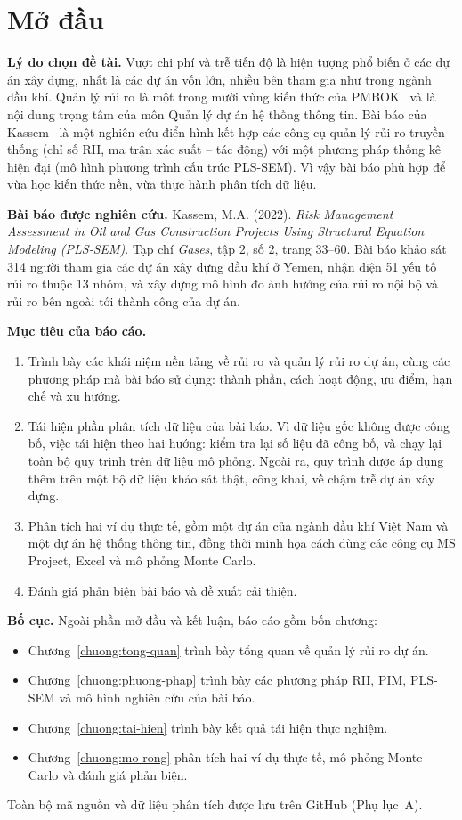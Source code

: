 \chapter*{Mở đầu}

\textbf{Lý do chọn đề tài.} Vượt chi phí và trễ tiến độ là hiện tượng phổ biến ở các dự án xây dựng, nhất là các dự án vốn lớn, nhiều bên tham gia như trong ngành dầu khí. Quản lý rủi ro là một trong mười vùng kiến thức của PMBOK~\cite{pmbok6} và là nội dung trọng tâm của môn Quản lý dự án hệ thống thông tin. Bài báo của Kassem~\cite{kassem2022} là một nghiên cứu điển hình kết hợp các công cụ quản lý rủi ro truyền thống (chỉ số RII, ma trận xác suất -- tác động) với một phương pháp thống kê hiện đại (mô hình phương trình cấu trúc PLS-SEM). Vì vậy bài báo phù hợp để vừa học kiến thức nền, vừa thực hành phân tích dữ liệu.

\textbf{Bài báo được nghiên cứu.} Kassem, M.A. (2022). \emph{Risk Management Assessment in Oil and Gas Construction Projects Using Structural Equation Modeling (PLS-SEM)}. Tạp chí \emph{Gases}, tập 2, số 2, trang 33--60. Bài báo khảo sát 314 người tham gia các dự án xây dựng dầu khí ở Yemen, nhận diện 51 yếu tố rủi ro thuộc 13 nhóm, và xây dựng mô hình đo ảnh hưởng của rủi ro nội bộ và rủi ro bên ngoài tới thành công của dự án.

\textbf{Mục tiêu của báo cáo.}
\begin{enumerate}
  \item Trình bày các khái niệm nền tảng về rủi ro và quản lý rủi ro dự án, cùng các phương pháp mà bài báo sử dụng: thành phần, cách hoạt động, ưu điểm, hạn chế và xu hướng.
  \item Tái hiện phần phân tích dữ liệu của bài báo. Vì dữ liệu gốc không được công bố, việc tái hiện theo hai hướng: kiểm tra lại số liệu đã công bố, và chạy lại toàn bộ quy trình trên dữ liệu mô phỏng. Ngoài ra, quy trình được áp dụng thêm trên một bộ dữ liệu khảo sát thật, công khai, về chậm trễ dự án xây dựng.
  \item Phân tích hai ví dụ thực tế, gồm một dự án của ngành dầu khí Việt Nam và một dự án hệ thống thông tin, đồng thời minh họa cách dùng các công cụ MS Project, Excel và mô phỏng Monte Carlo.
  \item Đánh giá phản biện bài báo và đề xuất cải thiện.
\end{enumerate}

\textbf{Bố cục.} Ngoài phần mở đầu và kết luận, báo cáo gồm bốn chương:
\begin{itemize}
  \item Chương~\ref{chuong:tong-quan} trình bày tổng quan về quản lý rủi ro dự án.
  \item Chương~\ref{chuong:phuong-phap} trình bày các phương pháp RII, PIM, PLS-SEM và mô hình nghiên cứu của bài báo.
  \item Chương~\ref{chuong:tai-hien} trình bày kết quả tái hiện thực nghiệm.
  \item Chương~\ref{chuong:mo-rong} phân tích hai ví dụ thực tế, mô phỏng Monte Carlo và đánh giá phản biện.
\end{itemize}
Toàn bộ mã nguồn và dữ liệu phân tích được lưu trên GitHub (Phụ lục~A).
